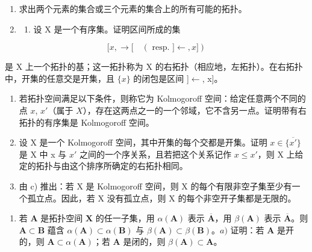 \BourbakiExerciseGroup

\begin{enumerate}
\def\labelenumi{\arabic{enumi})}
\item
  求出两个元素的集合或三个元素的集合上的所有可能的拓扑。
\item
  \begin{enumerate}
  \def\labelenumii{\alph{enumii})}
  \tightlist
  \item
    设 X 是一个有序集。证明区间所成的集
  \end{enumerate}
\end{enumerate}

\[
[ x, \rightarrow [ \quad (\text { resp. } ] \leftarrow , x ])
\]

是 X 上一个拓扑的基；这一拓扑称为 X 的右拓扑（相应地，左拓扑）。在右拓扑中，开集的任意交是开集，且 \(\{x\}\) 的闭包是区间 {]}\(\leftarrow\), x{]}。

\begin{enumerate}
\def\labelenumi{\alph{enumi})}
\setcounter{enumi}{1}
\item
  若拓扑空间满足以下条件，则称它为 Kolmogoroff 空间：给定任意两个不同的点 \(x\), \(x'\)（属于 \(X\)），存在这两点之一的一个邻域，它不含另一点。证明带有右拓扑的有序集是 Kolmogoroff 空间。
\item
  设 X 是一个 Kolmogoroff 空间，其中开集的每个交都是开集。证明 \(x \in \overline{\{x'\}}\) 是 X 中 x 与 \(x'\) 之间的一个序关系，且若把这个关系记作 \(x \leqslant x'\)，则 X 上给定的拓扑与由这个排序所确定的右拓扑相同。
\item
  由 c) 推出：若 X 是 Kolmogoroff 空间，则 X 的每个有限非空子集至少有一个孤立点。因此，若 X 没有孤立点，则 X 的每个非空开子集都是无限的。
\end{enumerate}

\begin{enumerate}
\def\labelenumi{\arabic{enumi})}
\setcounter{enumi}{2}
\tightlist
\item
  若 \(\mathbf{A}\) 是拓扑空间 \(\mathbf{X}\) 的任一子集，用 \(\alpha(\mathbf{A})\) 表示 \(\overline{\mathbf{A}}\)，用 \(\beta(\mathbf{A})\) 表示 \(\overline{\mathbf{A}}\)。则 \(\mathbf{A} \subset \mathbf{B}\) 蕴含 \(\alpha(\mathbf{A}) \subset \alpha(\mathbf{B})\) 与 \(\beta(\mathbf{A}) \subset \beta(\mathbf{B})\)。\(a)\) 证明：若 \(\mathbf{A}\) 是开的，则 \(\mathbf{A} \subset \alpha(\mathbf{A})\)；若 \(\mathbf{A}\) 是闭的，则 \(\beta(\mathbf{A}) \subset \mathbf{A}\)。
\end{enumerate}

